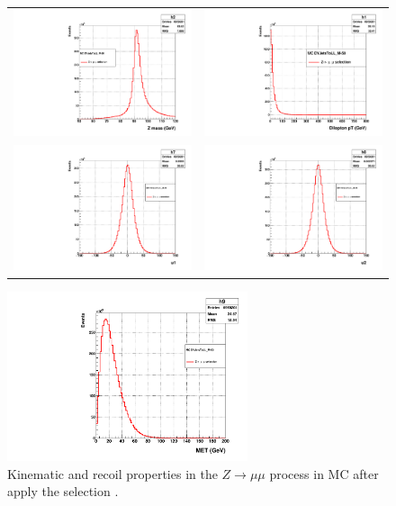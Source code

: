 \newpage
\begin{figure}[!ht]
\begin{tabular}{cc}
  \includegraphics[width=180pt]{figuresARC/recoil/MC/dileptonMass.pdf} &
  \includegraphics[width=180pt]{figuresARC/recoil//MC/dileptonpt.pdf} \\
  \includegraphics[width=180pt]{figuresARC/recoil/MC/u1.pdf} &
  \includegraphics[width=180pt]{figuresARC/recoil/MC/u2.pdf} \\
\end{tabular}
\begin{center}
  \includegraphics[width=200pt]{figuresARC/recoil/MC/met.pdf}
\end{center}
\caption{Kinematic and recoil properties in the $Z \to \mu \mu$ process in MC after apply the selection .}
\label{fig:METrecoil2}
\end{figure}

